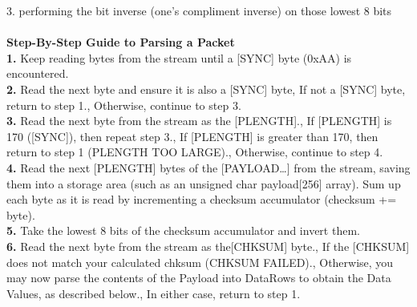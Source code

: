 \documentclass[a4 paper,12pt]{article}
\begin{document}
\begin{minipage}{0.98\textwidth}
3. performing the bit inverse (one's compliment inverse) on those lowest 8 bits\\\\  
\textbf{Step-By-Step Guide to Parsing a Packet}\\
\textbf{1.} Keep reading bytes from the stream until a [SYNC] byte (0xAA) is encountered.\\
\textbf{2.} Read the next byte and ensure it is also a [SYNC] byte, If not a [SYNC] byte, return to step 1., Otherwise, continue to step 3.\\
\textbf{3.} Read the next byte from the stream as the [PLENGTH].,  If [PLENGTH] is 170 ([SYNC]), then repeat step 3., If [PLENGTH] is greater than 170, then return to step 1 (PLENGTH TOO LARGE)., Otherwise, continue to step 4.\\
\textbf{4.} Read the next [PLENGTH] bytes of the [PAYLOAD…] from the stream, saving them into a storage area (such as an unsigned char payload[256] array). Sum up each byte as it is read by
incrementing a checksum accumulator (checksum += byte).\\
\textbf{5.} Take the lowest 8 bits of the checksum accumulator and invert them.\\
\textbf{6.} Read the next byte from the stream as the[CHKSUM] byte., If the [CHKSUM] does not match your calculated chksum (CHKSUM FAILED)., Otherwise, you may now parse the contents of the Payload into DataRows to obtain the Data
Values, as described below., In either case, return to step 1.\\\\
\end{minipage}
\end{document}
